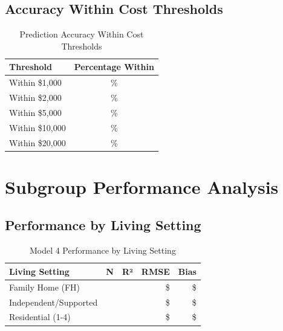 \subsection{Accuracy Within Cost Thresholds}

\begin{table}[h]
\centering
\caption{Prediction Accuracy Within Cost Thresholds}
\begin{tabular}{lc}
\toprule
\textbf{Threshold} & \textbf{Percentage Within} \\
\midrule
Within \$1,000 & \ModelFourWithinOneK{}\% \\
Within \$2,000 & \ModelFourWithinTwoK{}\% \\
Within \$5,000 & \ModelFourWithinFiveK{}\% \\
Within \$10,000 & \ModelFourWithinTenK{}\% \\
Within \$20,000 & \ModelFourWithinTwentyK{}\% \\
\bottomrule
\end{tabular}
\end{table}

\section{Subgroup Performance Analysis}

\subsection{Performance by Living Setting}

\begin{table}[h]
\centering
\caption{Model 4 Performance by Living Setting}
\begin{tabular}{lrrrr}
\toprule
\textbf{Living Setting} & \textbf{N} & \textbf{R²} & \textbf{RMSE} & \textbf{Bias} \\
\midrule
Family Home (FH) & \ModelFourSubgrouplivingFHN{} & \ModelFourSubgrouplivingFHRSquared{} & \$\ModelFourSubgrouplivingFHRMSE{} & \$\ModelFourSubgrouplivingFHBias{} \\
Independent/Supported & \ModelFourSubgrouplivingILSLN{} & \ModelFourSubgrouplivingILSLRSquared{} & \$\ModelFourSubgrouplivingILSLRMSE{} & \$\ModelFourSubgrouplivingILSLBias{} \\
Residential (1-4) & \ModelFourSubgrouplivingRHOneToFourN{} & \ModelFourSubgrouplivingRHOneToFourRSquared{} & \$\ModelFourSubgrouplivingRHOneToFourRMSE{} & \$\ModelFourSubgrouplivingRHOneToFourBias{} \\
\bottomrule
\end{tabular}
\end{table}

